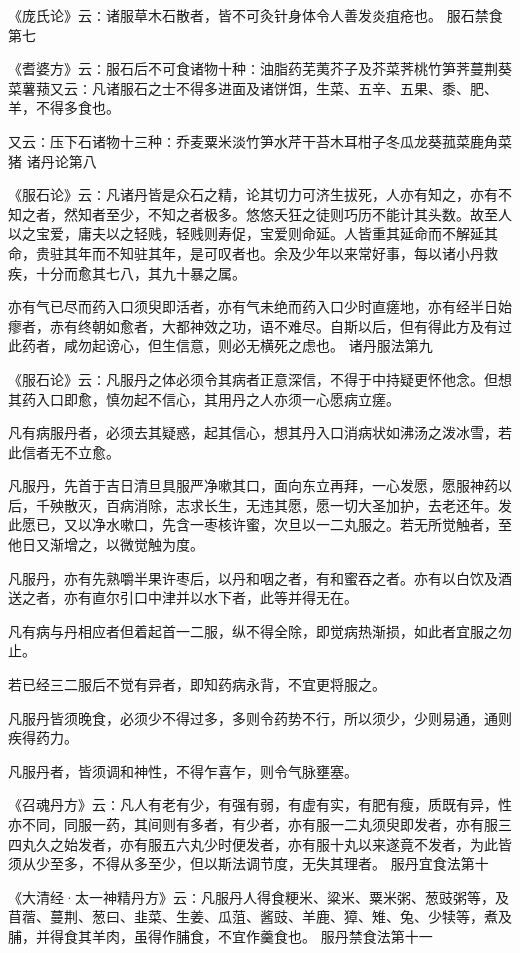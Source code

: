 \documentclass[a4paper,12pt,UTF8,twoside]{ctexbook}
\begin{document}
《庞氏论》云∶诸服草木石散者，皆不可灸针身体令人善发炎疽疮也。
服石禁食第七

《耆婆方》云∶服石后不可食诸物十种∶油脂药芜荑芥子及芥菜荠桃竹笋荠蔓荆葵菜薯蓣又云∶凡诸服石之士不得多进面及诸饼饵，生菜、五辛、五果、黍、肥、羊，不得多食也。

又云∶压下石诸物十三种∶乔麦粟米淡竹笋水芹干苔木耳柑子冬瓜龙葵菰菜鹿角菜猪
诸丹论第八

《服石论》云∶凡诸丹皆是众石之精，论其切力可济生拔死，人亦有知之，亦有不知之者，然知者至少，不知之者极多。悠悠夭狂之徒则巧历不能计其头数。故至人以之宝爱，庸夫以之轻贱，轻贱则寿促，宝爱则命延。人皆重其延命而不解延其命，贵驻其年而不知驻其年，是可叹者也。余及少年以来常好事，每以诸小丹救疾，十分而愈其七八，其九十暴之属。

亦有气已尽而药入口须臾即活者，亦有气未绝而药入口少时直瘥地，亦有经半日始瘳者，赤有终朝如愈者，大都神效之功，语不难尽。自斯以后，但有得此方及有过此药者，咸勿起谤心，但生信意，则必无横死之虑也。
诸丹服法第九

《服石论》云∶凡服丹之体必须令其病者正意深信，不得于中持疑更怀他念。但想其药入口即愈，慎勿起不信心，其用丹之人亦须一心愿病立瘥。

凡有病服丹者，必须去其疑惑，起其信心，想其丹入口消病状如沸汤之泼冰雪，若此信者无不立愈。

凡服丹，先首于吉日清旦具服严净嗽其口，面向东立再拜，一心发愿，愿服神药以后，千殃散灭，百病消除，志求长生，无违其愿，愿一切大圣加护，去老还年。发此愿已，又以净水嗽口，先含一枣核许蜜，次旦以一二丸服之。若无所觉触者，至他日又渐增之，以微觉触为度。

凡服丹，亦有先熟嚼半果许枣后，以丹和咽之者，有和蜜吞之者。亦有以白饮及酒送之者，亦有直尔引口中津并以水下者，此等并得无在。

凡有病与丹相应者但着起首一二服，纵不得全除，即觉病热渐损，如此者宜服之勿止。

若已经三二服后不觉有异者，即知药病永背，不宜更将服之。

凡服丹皆须晚食，必须少不得过多，多则令药势不行，所以须少，少则易通，通则疾得药力。

凡服丹者，皆须调和神性，不得乍喜乍，则令气脉壅塞。

《召魂丹方》云∶凡人有老有少，有强有弱，有虚有实，有肥有瘦，质既有异，性亦不同，同服一药，其间则有多者，有少者，亦有服一二丸须臾即发者，亦有服三四丸久之始发者，亦有服五六丸少时便发者，亦有服十丸以来遂竟不发者，为此皆须从少至多，不得从多至少，但以斯法调节度，无失其理者。
服丹宜食法第十

《大清经·太一神精丹方》云∶凡服丹人得食粳米、粱米、粟米粥、葱豉粥等，及苜蓿、蔓荆、葱曰、韭菜、生姜、瓜菹、酱豉、羊鹿、獐、雉、兔、少犊等，煮及脯，并得食其羊肉，虽得作脯食，不宜作羹食也。
服丹禁食法第十一
\end{document}

